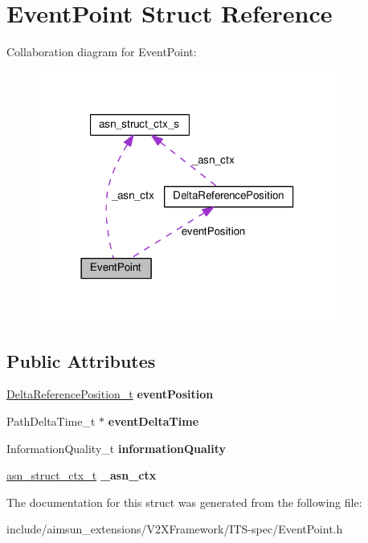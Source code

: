 \hypertarget{structEventPoint}{}\section{Event\+Point Struct Reference}
\label{structEventPoint}


Collaboration diagram for Event\+Point\+:\nopagebreak
\begin{figure}[H]
\begin{center}
\leavevmode
\includegraphics[width=278pt]{structEventPoint__coll__graph}
\end{center}
\end{figure}
\subsection*{Public Attributes}
\begin{DoxyCompactItemize}
\item 
\hyperlink{structDeltaReferencePosition}{Delta\+Reference\+Position\+\_\+t} {\bfseries event\+Position}\hypertarget{structEventPoint_a95548adf82220a1f72f4cd94de161be3}{}\label{structEventPoint_a95548adf82220a1f72f4cd94de161be3}

\item 
Path\+Delta\+Time\+\_\+t $\ast$ {\bfseries event\+Delta\+Time}\hypertarget{structEventPoint_aee7ba2aeb1fdf56d2dcb6d533ffe5cc9}{}\label{structEventPoint_aee7ba2aeb1fdf56d2dcb6d533ffe5cc9}

\item 
Information\+Quality\+\_\+t {\bfseries information\+Quality}\hypertarget{structEventPoint_a94203e672c3251a3064a2e37eb2d4d32}{}\label{structEventPoint_a94203e672c3251a3064a2e37eb2d4d32}

\item 
\hyperlink{structasn__struct__ctx__s}{asn\+\_\+struct\+\_\+ctx\+\_\+t} {\bfseries \+\_\+asn\+\_\+ctx}\hypertarget{structEventPoint_a4713ae15f1cddb7ebea30ec1f789a10f}{}\label{structEventPoint_a4713ae15f1cddb7ebea30ec1f789a10f}

\end{DoxyCompactItemize}


The documentation for this struct was generated from the following file\+:\begin{DoxyCompactItemize}
\item 
include/aimsun\+\_\+extensions/\+V2\+X\+Framework/\+I\+T\+S-\/spec/Event\+Point.\+h\end{DoxyCompactItemize}
